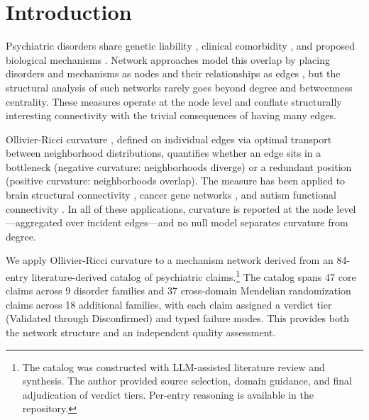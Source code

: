 \documentclass{article}
\begin{document}
\section{Introduction}

Psychiatric disorders share genetic liability \citep{crossdisorder2019genomic, anttila2018analysis}, clinical comorbidity \citep{cramer2010comorbidity}, and proposed biological mechanisms \citep{borsboom2017network}. Network approaches model this overlap by placing disorders and mechanisms as nodes and their relationships as edges \citep{borsboom2013network, fried2017mental}, but the structural analysis of such networks rarely goes beyond degree and betweenness centrality. These measures operate at the node level and conflate structurally interesting connectivity with the trivial consequences of having many edges.

Ollivier-Ricci curvature \citep{ollivier2009ricci}, defined on individual edges via optimal transport between neighborhood distributions, quantifies whether an edge sits in a bottleneck (negative curvature: neighborhoods diverge) or a redundant position (positive curvature: neighborhoods overlap). The measure has been applied to brain structural connectivity \citep{farooq2019network}, cancer gene networks \citep{sandhu2015graph}, and autism functional connectivity \citep{simhal2020measuring, elumalai2022graph}. In all of these applications, curvature is reported at the node level---aggregated over incident edges---and no null model separates curvature from degree.

We apply Ollivier-Ricci curvature to a mechanism network derived from an 84-entry literature-derived catalog of psychiatric claims.\footnote{The catalog was constructed with LLM-assisted literature review and synthesis. The author provided source selection, domain guidance, and final adjudication of verdict tiers. Per-entry reasoning is available in the repository.} The catalog spans 47 core claims across 9 disorder families and 37 cross-domain Mendelian randomization claims across 18 additional families, with each claim assigned a verdict tier (Validated through Disconfirmed) and typed failure modes. This provides both the network structure and an independent quality assessment.
\end{document}
